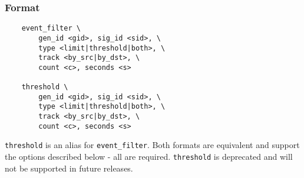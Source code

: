 \documentclass[english]{report}
\begin{document}
\subsubsection{Format}

\begin{verbatim}
    event_filter \
        gen_id <gid>, sig_id <sid>, \
        type <limit|threshold|both>, \
        track <by_src|by_dst>, \
        count <c>, seconds <s>  

    threshold \
        gen_id <gid>, sig_id <sid>, \
        type <limit|threshold|both>, \
        track <by_src|by_dst>, \
        count <c>, seconds <s>  
\end{verbatim}

\texttt{threshold} is an alias for \texttt{event\_filter}.  Both formats are
equivalent and support the options described below - all are required.
\texttt{threshold} is deprecated and will not be supported in future releases.
\end{document}

